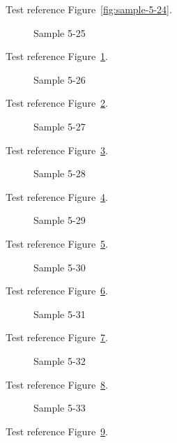 Test reference Figure~\ref{fig:sample-5-24}.

\begin{figure}[tbhp]
\caption{Sample 5-25}
\label{fig:sample-5-25}
\end{figure}

Test reference Figure~\ref{fig:sample-5-25}.

\begin{figure}[tbhp]
\caption{Sample 5-26}
\label{fig:sample-5-26}
\end{figure}

Test reference Figure~\ref{fig:sample-5-26}.

\begin{figure}[tbhp]
\caption{Sample 5-27}
\label{fig:sample-5-27}
\end{figure}

Test reference Figure~\ref{fig:sample-5-27}.

\begin{figure}[tbhp]
\caption{Sample 5-28}
\label{fig:sample-5-28}
\end{figure}

Test reference Figure~\ref{fig:sample-5-28}.

\begin{figure}[tbhp]
\caption{Sample 5-29}
\label{fig:sample-5-29}
\end{figure}

Test reference Figure~\ref{fig:sample-5-29}.

\begin{figure}[tbhp]
\caption{Sample 5-30}
\label{fig:sample-5-30}
\end{figure}

Test reference Figure~\ref{fig:sample-5-30}.

\begin{figure}[tbhp]
\caption{Sample 5-31}
\label{fig:sample-5-31}
\end{figure}

Test reference Figure~\ref{fig:sample-5-31}.

\begin{figure}[tbhp]
\caption{Sample 5-32}
\label{fig:sample-5-32}
\end{figure}

Test reference Figure~\ref{fig:sample-5-32}.

\begin{figure}[tbhp]
\caption{Sample 5-33}
\label{fig:sample-5-33}
\end{figure}

Test reference Figure~\ref{fig:sample-5-33}.

